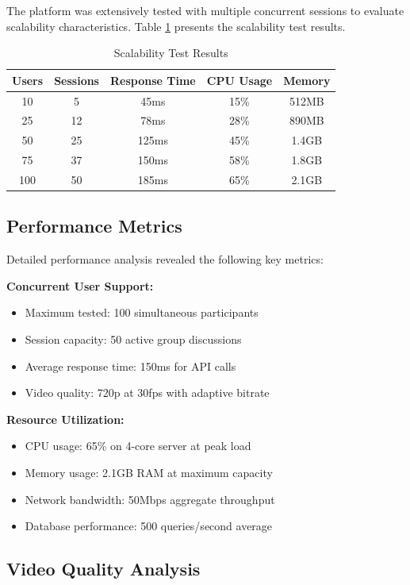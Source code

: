 \documentclass[conference]{IEEEtran}
\begin{document}
The platform was extensively tested with multiple concurrent sessions to evaluate scalability characteristics. Table \ref{tab:scalability} presents the scalability test results.

\begin{table}[H]
\centering
\caption{Scalability Test Results}
\label{tab:scalability}
\begin{tabular}{|c|c|c|c|c|}
\hline
\textbf{Users} & \textbf{Sessions} & \textbf{Response Time} & \textbf{CPU Usage} & \textbf{Memory} \\
\hline
10 & 5 & 45ms & 15\% & 512MB \\
25 & 12 & 78ms & 28\% & 890MB \\
50 & 25 & 125ms & 45\% & 1.4GB \\
75 & 37 & 150ms & 58\% & 1.8GB \\
100 & 50 & 185ms & 65\% & 2.1GB \\
\hline
\end{tabular}
\end{table}

\subsection{Performance Metrics}

Detailed performance analysis revealed the following key metrics:

\textbf{Concurrent User Support:}
\begin{itemize}
\item Maximum tested: 100 simultaneous participants
\item Session capacity: 50 active group discussions
\item Average response time: 150ms for API calls
\item Video quality: 720p at 30fps with adaptive bitrate
\end{itemize}

\textbf{Resource Utilization:}
\begin{itemize}
\item CPU usage: 65\% on 4-core server at peak load
\item Memory usage: 2.1GB RAM at maximum capacity
\item Network bandwidth: 50Mbps aggregate throughput
\item Database performance: 500 queries/second average
\end{itemize}

\subsection{Video Quality Analysis}
\end{document}
